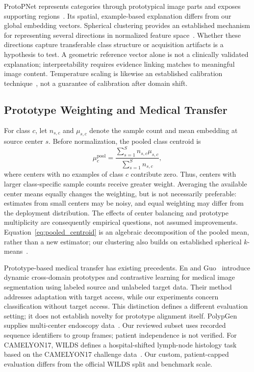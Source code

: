ProtoPNet represents categories through prototypical image parts and exposes supporting regions~\cite{chen2019protopnet}. Its spatial, example-based explanation differs from our global embedding vectors. Spherical clustering provides an established mechanism for representing several directions in normalized feature space~\cite{dhillon2001spherical}. Whether these directions capture transferable class structure or acquisition artifacts is a hypothesis to test. A geometric reference vector alone is not a clinically validated explanation; interpretability requires evidence linking matches to meaningful image content. Temperature scaling is likewise an established calibration technique~\cite{guo2017calibration}, not a guarantee of calibration after domain shift.

\subsection{Prototype Weighting and Medical Transfer}
For class $c$, let $n_{s,c}$ and $\mu_{s,c}$ denote the sample count and mean embedding at source center $s$. Before normalization, the pooled class centroid is
\begin{equation}
    \mu_c^{\mathrm{pool}}=
    \frac{\sum_{s=1}^{S}n_{s,c}\mu_{s,c}}
    {\sum_{s=1}^{S}n_{s,c}},
    \label{eq:pooled_centroid}
\end{equation}
where centers with no examples of class $c$ contribute zero. Thus, centers with larger class-specific sample counts receive greater weight. Averaging the available center means equally changes the weighting, but is not necessarily preferable: estimates from small centers may be noisy, and equal weighting may differ from the deployment distribution. The effects of center balancing and prototype multiplicity are consequently empirical questions, not assumed improvements. Equation~\ref{eq:pooled_centroid} is an algebraic decomposition of the pooled mean, rather than a new estimator; our clustering also builds on established spherical $k$-means~\cite{dhillon2001spherical}.

Prototype-based medical transfer has existing precedents. En and Guo~\cite{en2024dpcl} introduce dynamic cross-domain prototypes and contrastive learning for medical image segmentation using labeled source and unlabeled target data. Their method addresses adaptation with target access, while our experiments concern classification without target access. This distinction defines a different evaluation setting; it does not establish novelty for prototype alignment itself. PolypGen supplies multi-center endoscopy data~\cite{ali2023polypgen}. Our reviewed subset uses recorded sequence identifiers to group frames; patient independence is not verified. For CAMELYON17, WILDS defines a hospital-shifted lymph-node histology task~\cite{koh2021wilds} based on the CAMELYON17 challenge data~\cite{bandi2019camelyon}. Our custom, patient-capped evaluation differs from the official WILDS split and benchmark scale.

